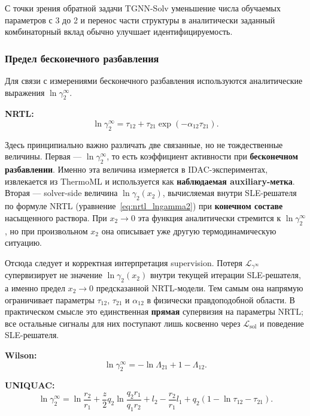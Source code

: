 \documentclass[11pt]{article}
\begin{document}
С точки зрения обратной задачи TGNN-Solv уменьшение числа обучаемых параметров с 3 до 2 и перенос части структуры в аналитически заданный комбинаторный вклад обычно улучшает идентифицируемость.

\subsubsection{Предел бесконечного разбавления}

Для связи с измерениями бесконечного разбавления используются аналитические выражения $\ln\gamma_2^{\infty}$.

\textbf{NRTL:}
\begin{equation*}
\ln\gamma_2^{\infty} = \tau_{12} + \tau_{21}\exp(-\alpha_{12}\tau_{21}).
\end{equation*}

Здесь принципиально важно различать две связанные, но не тождественные величины. Первая --- $\ln\gamma_2^{\infty}$, то есть коэффициент активности при \textbf{бесконечном разбавлении}. Именно эта величина измеряется в IDAC-экспериментах, извлекается из ThermoML и используется как \textbf{наблюдаемая auxiliary-метка}. Вторая --- solver-side величина $\ln\gamma_2(x_2)$, вычисляемая внутри SLE-решателя по формуле NRTL (уравнение~\eqref{eq:nrtl_lngamma2}) при \textbf{конечном составе} насыщенного раствора. При $x_2 \to 0$ эта функция аналитически стремится к $\ln\gamma_2^{\infty}$, но при произвольном $x_2$ она описывает уже другую термодинамическую ситуацию.

Отсюда следует и корректная интерпретация supervision. Потеря $\mathcal{L}_{\gamma^\infty}$ супервизирует не значение $\ln\gamma_2(x_2)$ внутри текущей итерации SLE-решателя, а именно предел $x_2\to 0$ предсказанной NRTL-модели. Тем самым она напрямую ограничивает параметры $\tau_{12}$, $\tau_{21}$ и $\alpha_{12}$ в физически правдоподобной области. В практическом смысле это единственная \textbf{прямая} супервизия на параметры NRTL; все остальные сигналы для них поступают лишь косвенно через $\mathcal{L}_{\mathrm{sol}}$ и поведение SLE-решателя.

\textbf{Wilson:}
\begin{equation*}
\ln\gamma_2^{\infty} = -\ln\Lambda_{21} + 1 - \Lambda_{12}.
\end{equation*}

\textbf{UNIQUAC:}
\begin{equation*}
\ln\gamma_2^{\infty} = \ln\frac{r_2}{r_1} + \frac{z}{2}q_2\ln\frac{q_2r_1}{q_1r_2}
+ l_2 - \frac{r_2}{r_1}l_1 + q_2\left(1-\ln\tau_{12}-\tau_{21}\right).
\end{equation*}
\end{document}
